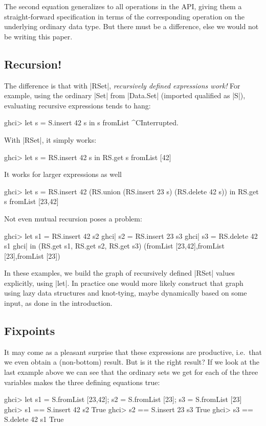 \documentclass[manuscript,review,screen,acmsmall]{acmart}
\begin{document}
The second equation generalizes to all operations in the API, giving them a straight-forward specification in terms of the corresponding operation on the underlying ordinary data type. But there must be a difference, else we would not be writing this paper.

\subsection{Recursion!}

The difference is that with |RSet|, \emph{recursively defined expressions work!} For example, using the ordinary |Set| from |Data.Set| (imported qualified as |S|), evaluating recursive expressions tends to hang:
\begin{code}
ghci> let s = S.insert 42 s in s
fromList ^CInterrupted.
\end{code}
With |RSet|, it simply works:
\begin{code}
ghci> let s = RS.insert 42 s in RS.get s
fromList [42]
\end{code}
It works for larger expressions as well
\begin{code}
ghci> let s = RS.insert 42 (RS.union (RS.insert 23 s) (RS.delete 42 s)) in RS.get s
fromList [23,42]
\end{code}
Not even mutual recursion poses a problem:
\begin{code}
ghci>  let  s1 = RS.insert 42 s2
ghci|       s2 = RS.insert 23 s3
ghci|       s3 = RS.delete 42 s1
ghci|  in (RS.get s1, RS.get s2, RS.get s3)
(fromList [23,42],fromList [23],fromList [23])
\end{code}

In these examples, we build the graph of recursively defined |RSet| values explicitly, using |let|. In practice one would more likely construct that graph using lazy data structures and knot-tying, maybe dynamically based on some input, as done in the introduction.

\subsection{Fixpoints}

It may come as a pleasant surprise that these expressions are productive, i.e.\ that we even obtain a (non-bottom) result. But is it the right result? If we look at the last example above we can see that the ordinary sets we get for each of the three variables makes the three defining equations true:
\begin{code}
ghci> let s1 = S.fromList [23,42]; s2 = S.fromList [23]; s3 = S.fromList [23]
ghci> s1 == S.insert 42 s2
True
ghci> s2 == S.insert 23 s3
True
ghci> s3 == S.delete 42 s1
True
\end{code}
\end{document}
